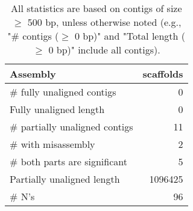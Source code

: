 \documentclass[12pt,a4paper]{article}
\begin{document}
\begin{table}[ht]
\begin{center}
\caption{All statistics are based on contigs of size $\geq$ 500 bp, unless otherwise noted (e.g., "\# contigs ($\geq$ 0 bp)" and "Total length ($\geq$ 0 bp)" include all contigs).}
\begin{tabular}{|l*{1}{|r}|}
\hline
Assembly & scaffolds \\ \hline
\# fully unaligned contigs & 0 \\ \hline
Fully unaligned length & 0 \\ \hline
\# partially unaligned contigs & 11 \\ \hline
\hspace{5mm}\# with misassembly & 2 \\ \hline
\hspace{5mm}\# both parts are significant & 5 \\ \hline
Partially unaligned length & 1096425 \\ \hline
\# N's & 96 \\ \hline
\end{tabular}
\end{center}
\end{table}
\end{document}
